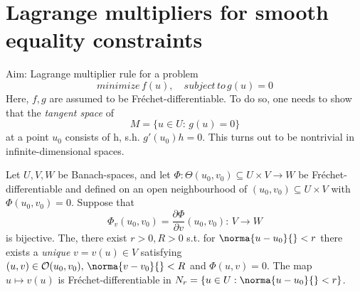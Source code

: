 \section{Lagrange multipliers for smooth equality constraints}\label{section_1.3}
Aim: Lagrange multiplier rule for a problem 
\[
	minimize\,f(u),\quad subject\,to\,g(u) = 0
\]
Here, $f,g$ are assumed to be Fréchet-differentiable. To do so, one needs to show that the \emph{tangent space} of
\[
	M=\{u\in U:\,g(u)=0\}
\]
at a point $u_0$ consists of h, s.h. $g'(u_0)h = 0$. This turns out to be nontrivial in infinite-dimensional spaces.
\begin{theorem}\label{theorem_1.26}
	Let $U,V,W$ be Banach-spaces, and let $\Phi:\Theta(u_0,v_0)\subseteq U\times V\to W$ %
	be Fréchet-differentiable and defined on an open neighbourhood of $(u_0,v_0)\subseteq U\times V$ with $\Phi(u_0,v_0) = 0$. Suppose that 
	\[
		\Phi_v(u_0,v_0)=\frac{\partial\Phi}{\partial v}(u_0,v_0):\,V\to W
	\]
	is bijective. The, there exist $r>0, R>0$ s.t. for $\norma{u-u_0}{}<r$ there exists a \emph{unique} $v=v(u)\in V$ satisfying $(u,v)\in\mathcal{O}(u_0,v_0),\,\norma{v-v_0}{}<R$ and $\Phi(u,v) = 0$. The map $u\mapsto v(u)$ is Fréchet-differentiable in $N_r=\{u\in U:\norma{u-u_0}{}<r\}$. 
\end{theorem}
